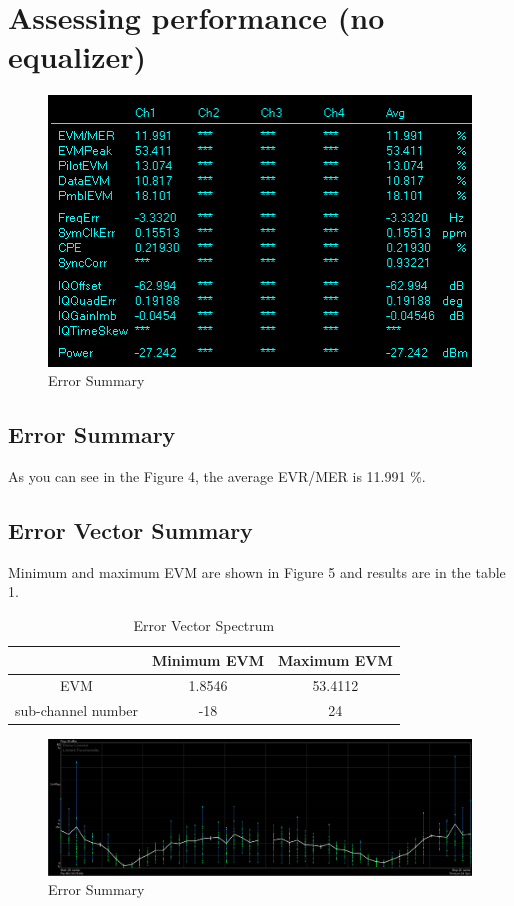 \documentclass{article}
\begin{document}
\section{Assessing performance (no equalizer)}

\begin{figure}[htb!]
    \centering
    \includegraphics[scale=0.8]{error-summary}
    \caption{Error Summary}
\end{figure}

\subsection{Error Summary}
As you can see in the Figure 4, the average EVR/MER is 11.991 \%.

\subsection{Error Vector Summary}

Minimum and maximum EVM are shown in Figure 5 and results are in the table 1.

\begin{table}[htb!]
    \centering
    \begin{tabular}{|c|c|c|}
    \hline
             & Minimum EVM & Maximum EVM\\ \hline
         EVM & 1.8546 & 53.4112 \\ \hline
         sub-channel number & -18 & 24 \\ \hline
    \end{tabular}
    \caption{Error Vector Spectrum}
\end{table}

\begin{figure}[htb!]
    \centering
    \includegraphics[scale=0.3]{error-vector-spectrum}
    \caption{Error Summary}
\end{figure}
\end{document}
